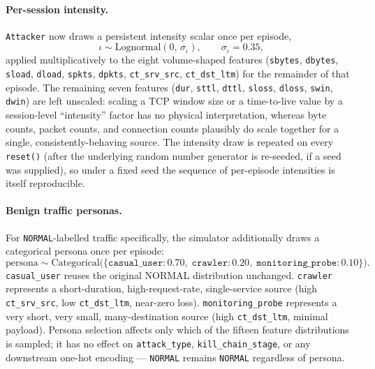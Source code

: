\paragraph{Per-session intensity.}
\texttt{Attacker} now draws a persistent intensity scalar once per episode,
%
\begin{equation}
  \iota \sim \text{Lognormal}(0,\, \sigma_\iota), \qquad \sigma_\iota = 0.35,
  \label{eq:intensity}
\end{equation}
%
applied multiplicatively to the eight volume-shaped features
(\texttt{sbytes}, \texttt{dbytes}, \texttt{sload}, \texttt{dload},
\texttt{spkts}, \texttt{dpkts}, \texttt{ct\_srv\_src}, \texttt{ct\_dst\_ltm})
for the remainder of that episode. The remaining seven features
(\texttt{dur}, \texttt{sttl}, \texttt{dttl}, \texttt{sloss}, \texttt{dloss},
\texttt{swin}, \texttt{dwin}) are left unscaled: scaling a TCP window size or
a time-to-live value by a session-level ``intensity'' factor has no physical
interpretation, whereas byte counts, packet counts, and connection counts
plausibly do scale together for a single, consistently-behaving source. The
intensity draw is repeated on every \texttt{reset()} (after the underlying
random number generator is re-seeded, if a seed was supplied), so under a
fixed seed the sequence of per-episode intensities is itself reproducible.

\paragraph{Benign traffic personas.}
For \texttt{NORMAL}-labelled traffic specifically, the simulator additionally
draws a categorical persona once per episode:
%
\begin{equation}
  \text{persona} \sim \text{Categorical}\bigl(\{\texttt{casual\_user}: 0.70,\;
  \texttt{crawler}: 0.20,\; \texttt{monitoring\_probe}: 0.10\}\bigr).
\end{equation}
%
\texttt{casual\_user} reuses the original NORMAL distribution unchanged.
\texttt{crawler} represents a short-duration, high-request-rate,
single-service source (high \texttt{ct\_srv\_src}, low \texttt{ct\_dst\_ltm},
near-zero loss). \texttt{monitoring\_probe} represents a very short, very
small, many-destination source (high \texttt{ct\_dst\_ltm}, minimal
payload). Persona selection affects only which of the fifteen feature
distributions is sampled; it has no effect on \texttt{attack\_type},
\texttt{kill\_chain\_stage}, or any downstream one-hot encoding —
\texttt{NORMAL} remains \texttt{NORMAL} regardless of persona.

